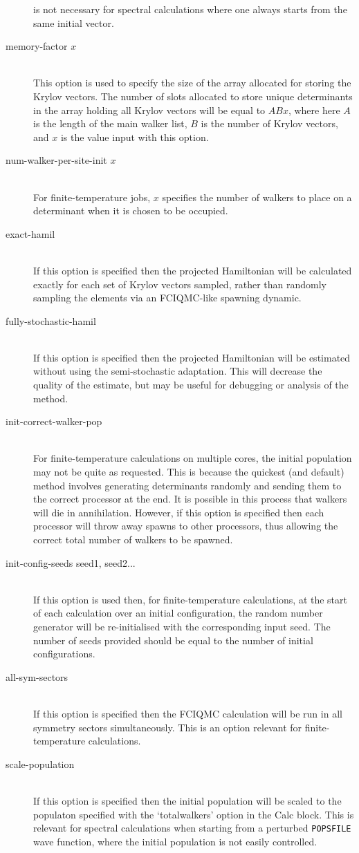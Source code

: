 \documentclass[a4paper,notitlepage]{scrreprt}
\newcommand\codeitem[1]{\needspace{1.5\baselineskip}\item[\textnormal{\ttfamily #1 \nopagebreak}] \hfill \\ \nopagebreak}
\let\code\lstinline
\begin{document}
\begin{description}
            is not necessary for spectral calculations where one always starts
            from the same initial vector.
        \codeitem{memory-factor $x$}
            This option is used to specify the size of the array allocated for
            storing the Krylov vectors. The number of slots allocated to store
            unique determinants in the array holding all Krylov vectors will be
            equal to $ABx$, where here $A$ is the length of the main walker
            list, $B$ is the number of Krylov vectors, and $x$ is the value input
            with this option.
        \codeitem{num-walker-per-site-init $x$}
            For finite-temperature jobs, $x$ specifies the number of walkers to
            place on a determinant when it is chosen to be occupied.
        \codeitem{exact-hamil}
            If this option is specified then the projected Hamiltonian will
            be calculated exactly for each set of Krylov vectors sampled,
            rather than randomly sampling the elements via an FCIQMC-like
            spawning dynamic.
        \codeitem{fully-stochastic-hamil}
            If this option is specified then the projected Hamiltonian will be
            estimated without using the semi-stochastic adaptation. This will
            decrease the quality of the estimate, but may be useful for
            debugging or analysis of the method.
        \codeitem{init-correct-walker-pop}
            For finite-temperature calculations on multiple cores, the initial
            population may not be quite as requested. This is because the
            quickest (and default) method involves generating determinants
            randomly and sending them to the correct processor at the end. It
            is possible in this process that walkers will die in annihilation.
            However, if this option is specified then each processor will throw
            away spawns to other processors, thus allowing the correct total
            number of walkers to be spawned.
        \codeitem{init-config-seeds seed1, seed2...}
            If this option is used then, for finite-temperature calculations,
            at the start of each calculation over an initial configuration,
            the random number generator will be re-initialised with the
            corresponding input seed. The number of seeds provided should be
            equal to the number of initial configurations.
        \codeitem{all-sym-sectors}
            If this option is specified then the FCIQMC calculation will be
            run in all symmetry sectors simultaneously. This is an option
            relevant for finite-temperature calculations.
        \codeitem{scale-population}
            If this option is specified then the initial population will be
            scaled to the populaton specified with the `totalwalkers' option
            in the Calc block. This is relevant for spectral calculations when
            starting from a perturbed \code{POPSFILE} wave function, where the
            initial population is not easily controlled.
    \end{description}
\end{document}
